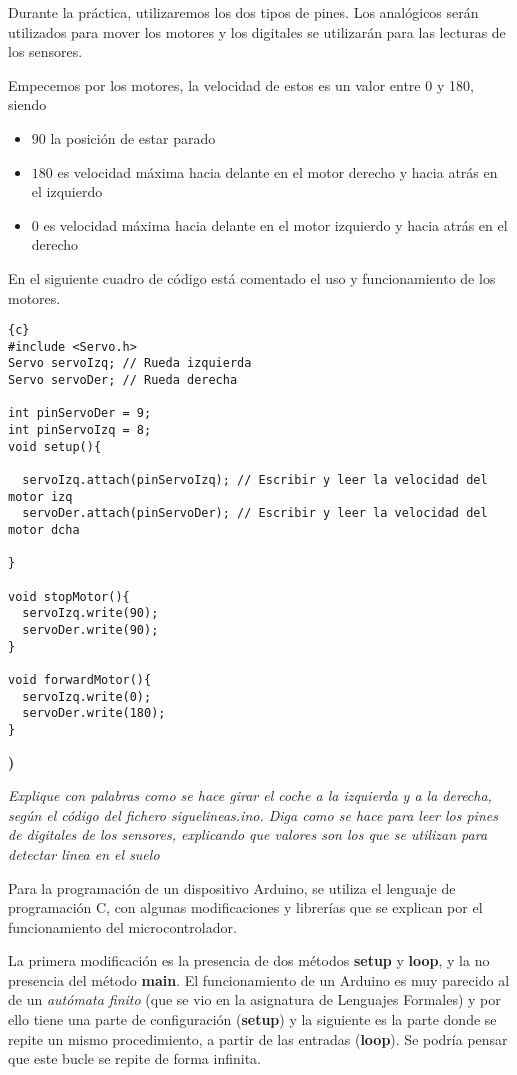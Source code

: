 \documentclass{article}
\newcounter{pregunta}
\newcommand\prop[1]%
{\addtocounter{pregunta}{1}
\noindent%
{\color{naranja_muy}\small\bf\thepregunta)}
\parbox[t]{.95\linewidth}{\it #1}}
\begin{document}
Durante la práctica, utilizaremos los dos tipos de pines. Los
analógicos serán utilizados para mover los motores y los
digitales se utilizarán para las lecturas de los sensores.

Empecemos por los motores, la velocidad de estos es un valor entre $0$
y 180, siendo 
\begin{itemize}
\item $90$ la posición de estar parado
\item $180$ es velocidad máxima hacia delante en el motor derecho y hacia
atrás en el izquierdo
\item $0$ es velocidad máxima hacia delante en el motor  izquierdo y hacia
atrás en el derecho
\end{itemize}

En el siguiente cuadro de código está comentado el uso y
funcionamiento de los motores.


\begin{lstlisting}[frame=lines,fontsize=\scriptsize,linenos]{c}
#include <Servo.h>
Servo servoIzq; // Rueda izquierda
Servo servoDer; // Rueda derecha

int pinServoDer = 9;
int pinServoIzq = 8;
void setup(){
 
  servoIzq.attach(pinServoIzq); // Escribir y leer la velocidad del motor izq
  servoDer.attach(pinServoDer); // Escribir y leer la velocidad del motor dcha
  
}

void stopMotor(){
  servoIzq.write(90); 
  servoDer.write(90);
}

void forwardMotor(){
  servoIzq.write(0); 
  servoDer.write(180);
}
\end{lstlisting}


\prop{Explique con palabras como se hace girar el coche a la izquierda y a la derecha, según el código del fichero \emph{siguelineas.ino}. Diga como se hace para leer los pines de digitales de los sensores, explicando que valores son los que se utilizan para detectar linea en el suelo}
\label{sec:orgf83509a}

Para la programación de un dispositivo Arduino, se utiliza el lenguaje
de programación C, con algunas modificaciones y librerías que se
explican por el funcionamiento del microcontrolador.

La primera modificación es la presencia de dos métodos \textbf{setup} y
\textbf{loop}, y la no presencia del método \textbf{main}. El funcionamiento de un
Arduino es muy parecido al de un \emph{autómata finito} (que se vio en la
asignatura de Lenguajes Formales) y por ello tiene una parte de
configuración (\textbf{setup}) y la siguiente es la parte donde se repite un
mismo procedimiento, a partir de las entradas (\textbf{loop}). Se podría
pensar que este bucle se repite de forma infinita.
\end{document}
